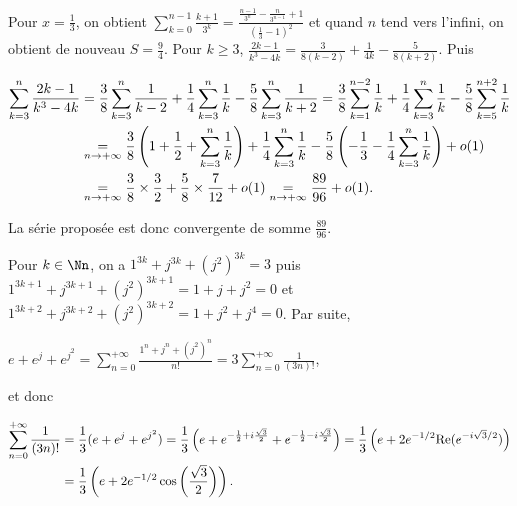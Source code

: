 {{Pour $x=\frac{1}{3}$, on obtient  $\sum_{k=0}^{n-1}\frac{k+1}{3^k}=\frac{\frac{n-1}{3^n}-\frac{n}{3^{n-1}}+1}{\left(\frac{1}{3}-1\right)^2}$ et quand $n$ tend vers l'infini, on obtient de nouveau $S=\frac{9}{4}$.
Pour $k\geqslant3$, $\frac{2k-1}{k^3-4k}=\frac{3}{8(k-2)}+\frac{1}{4k}-\frac{5}{8(k+2)}$. Puis

\begin{align*}\ensuremath
\sum_{k=3}^{n}\frac{2k-1}{k^3-4k}&=\frac{3}{8}\sum_{k=3}^{n}\frac{1}{k-2}+\frac{1}{4}\sum_{k=3}^{n}\frac{1}{k}-\frac{5}{8}\sum_{k=3}^{n}\frac{1}{k+2}=\frac{3}{8}\sum_{k=1}^{n-2}\frac{1}{k}+\frac{1}{4}\sum_{k=3}^{n}\frac{1}{k}-\frac{5}{8}\sum_{k=5}^{n+2}\frac{1}{k}\\
 &\underset{n\rightarrow+\infty}{=}\frac{3}{8}\left(1+\frac{1}{2}+\sum_{k=3}^{n}\frac{1}{k}\right)+\frac{1}{4}\sum_{k=3}^{n}\frac{1}{k}-\frac{5}{8}\left(-\frac{1}{3}-\frac{1}{4}\sum_{k=3}^{n}\frac{1}{k}\right)+o(1)\\
 &\underset{n\rightarrow+\infty}{=}\frac{3}{8}\times\frac{3}{2}+\frac{5}{8}\times\frac{7}{12}+o(1)\underset{n\rightarrow+\infty}{=}\frac{89}{96}+ o(1) .
\end{align*}

La série proposée est donc convergente de somme $\frac{89}{96}$.

\begin{center}
\end{center}
Pour $k\in\Nn$, on a $1^{3k}+j^{3k}+(j^2)^{3k}=3$ puis $1^{3k+1}+j^{3k+1}+(j^2)^{3k+1} =1+j+j^2= 0$ et $1^{3k+2}+j^{3k+2}+(j^2)^{3k+2}=1+j^2 + j^4 = 0$. Par suite,

\begin{center}
$e+e^j+e^{j^2}=\sum_{n=0}^{+\infty}\frac{1^n+j^n+(j^2)^n}{n!}=3\sum_{n=0}^{+\infty}\frac{1}{(3n)!}$,
\end{center}

et donc

\begin{align*}\ensuremath
\sum_{n=0}^{+\infty}\frac{1}{(3n)!}&=\frac{1}{3}(e+e^j+e^{j^2})=\frac{1}{3}\left(e+e^{-\frac{1}{2}+i\frac{\sqrt{3}}{2}}+e^{-\frac{1}{2}-i\frac{\sqrt{3}}{2}}\right) =\frac{1}{3}\left(e + 2e^{-1/2}\text{Re}(e^{-i\sqrt{3}/2})\right)\\
 &=\frac{1}{3}\left(e +2e^{-1/2}\cos\left(\frac{\sqrt{3}}{2}\right)\right).
\end{align*}

}}
